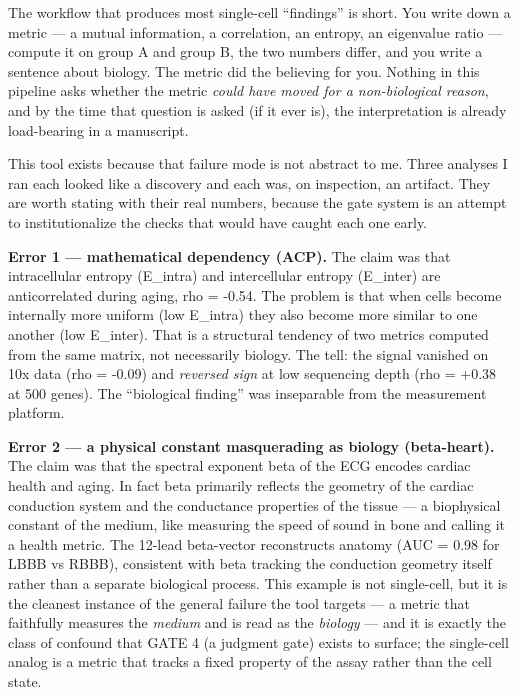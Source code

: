 \documentclass[
  11pt,
]{article}
\begin{document}
The workflow that produces most single-cell ``findings'' is short. You
write down a metric --- a mutual information, a correlation, an entropy,
an eigenvalue ratio --- compute it on group A and group B, the two
numbers differ, and you write a sentence about biology. The metric did
the believing for you. Nothing in this pipeline asks whether the metric
\emph{could have moved for a non-biological reason}, and by the time
that question is asked (if it ever is), the interpretation is already
load-bearing in a manuscript.

This tool exists because that failure mode is not abstract to me. Three
analyses I ran each looked like a discovery and each was, on inspection,
an artifact. They are worth stating with their real numbers, because the
gate system is an attempt to institutionalize the checks that would have
caught each one early.

\textbf{Error 1 --- mathematical dependency (ACP).} The claim was that
intracellular entropy (E\_intra) and intercellular entropy (E\_inter)
are anticorrelated during aging, rho = -0.54. The problem is that when
cells become internally more uniform (low E\_intra) they also become
more similar to one another (low E\_inter). That is a structural
tendency of two metrics computed from the same matrix, not necessarily
biology. The tell: the signal vanished on 10x data (rho = -0.09) and
\emph{reversed sign} at low sequencing depth (rho = +0.38 at 500 genes).
The ``biological finding'' was inseparable from the measurement
platform.

\textbf{Error 2 --- a physical constant masquerading as biology
(beta-heart).} The claim was that the spectral exponent beta of the ECG
encodes cardiac health and aging. In fact beta primarily reflects the
geometry of the cardiac conduction system and the conductance properties
of the tissue --- a biophysical constant of the medium, like measuring
the speed of sound in bone and calling it a health metric. The 12-lead
beta-vector reconstructs anatomy (AUC = 0.98 for LBBB vs RBBB),
consistent with beta tracking the conduction geometry itself rather than
a separate biological process. This example is not single-cell, but it
is the cleanest instance of the general failure the tool targets --- a
metric that faithfully measures the \emph{medium} and is read as the
\emph{biology} --- and it is exactly the class of confound that GATE 4
(a judgment gate) exists to surface; the single-cell analog is a metric
that tracks a fixed property of the assay rather than the cell state.
\end{document}
